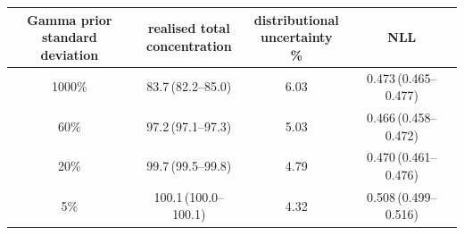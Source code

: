 \begin{tabular}{cccc}
\toprule
\shortstack{Gamma prior\\standard deviation} & \shortstack{realised total\\concentration} & \shortstack{distributional\\uncertainty \%} & NLL \\
\midrule
1000\% & 83.7\,(82.2--85.0) & 6.03 & 0.473\,(0.465--0.477) \\
60\% & 97.2\,(97.1--97.3) & 5.03 & 0.466\,(0.458--0.472) \\
20\% & 99.7\,(99.5--99.8) & 4.79 & 0.470\,(0.461--0.476) \\
5\% & 100.1\,(100.0--100.1) & 4.32 & 0.508\,(0.499--0.516) \\
\bottomrule
\end{tabular}
